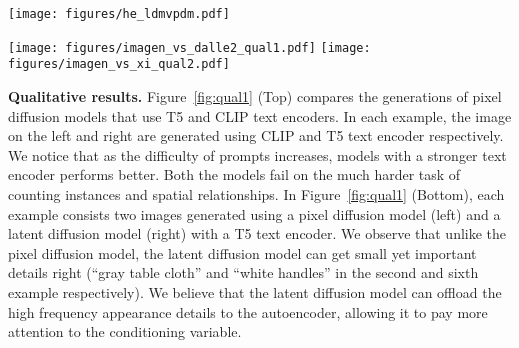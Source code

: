 \begin{table}[!t]
    \begin{minipage}[t]{0.34\linewidth}
        \centering
        \vspace{0pt}
        \setlength\abovecaptionskip{0pt}
        \texttt{[image: figures/he\_ldmvpdm.pdf]} 
        \label{exp:fig:main_res_ldmvpdm}     
    \end{minipage}\hfill
    \begin{minipage}[t]{0.65\linewidth}
            \vspace{0pt}
            \centering
            \texttt{[image: figures/imagen\_vs\_dalle2\_qual1.pdf]}
            \centering
            \texttt{[image: figures/imagen\_vs\_xi\_qual2.pdf]}    
          \label{fig:qual1}
        \end{minipage}\vspace{-1.5em}
\end{table}
\par \noindent \textbf{Qualitative results.}
Figure~\ref{fig:qual1} (Top) compares the generations of pixel diffusion models that use T5 and CLIP text encoders. In each example, the image on the left and right are generated using CLIP and T5 text encoder respectively.
We notice that as the difficulty of prompts increases, models with a stronger text encoder performs better. Both the models fail on the much harder task of counting instances and spatial relationships. 
In Figure~\ref{fig:qual1} (Bottom), each example consists two images generated using a pixel diffusion model (left) and a latent diffusion model (right) with a T5 text encoder. We observe that unlike the pixel diffusion model, the latent diffusion model can get small yet important details right (``gray table cloth'' and ``white handles'' in the second and sixth example respectively).
We believe that the latent diffusion model can offload the high frequency appearance details to the autoencoder, allowing it to pay more attention to the conditioning variable. 








